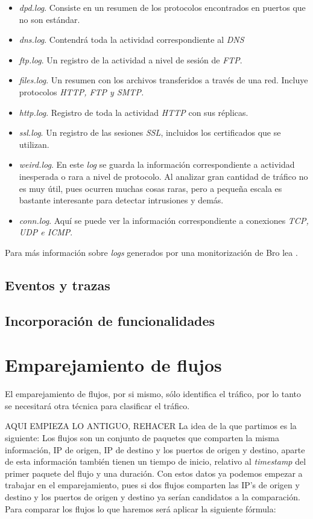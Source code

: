 \begin{itemize}
\item \textit{dpd.log}. Consiste en un resumen de los protocolos encontrados en puertos que no son estándar.
\item \textit{dns.log}. Contendrá toda la actividad correspondiente al \textit{DNS}
\item \textit{ftp.log}. Un registro de la actividad a nivel de sesión de \textit{FTP}.
\item \textit{files.log}. Un resumen con los archivos transferidos a través de una red. Incluye 
protocolos \textit{HTTP, FTP y SMTP.}
\item \textit{http.log}. Registro de toda la actividad \textit{HTTP} con sus réplicas.
\item \textit{ssl.log}. Un registro de las sesiones \textit{SSL}, incluidos los certificados que se utilizan.
\item \textit{weird.log}. En este \textit{log} se guarda la información correspondiente a actividad 
inesperada o rara a nivel de protocolo. Al analizar gran cantidad de tráfico no es muy útil, pues ocurren 
muchas cosas raras, pero a pequeña escala es bastante interesante para detectar intrusiones y demás.
\item \textit{conn.log}. Aquí se puede ver la información correspondiente a conexiones  \textit{TCP, UDP e ICMP}.
\end{itemize}

Para más información sobre \textit{logs} generados por una monitorización de Bro lea \cite{brologs}.


\subsection{Eventos y trazas}

\subsection{Incorporación de funcionalidades}

\section{Emparejamiento de flujos}

El emparejamiento de flujos, por si mismo, sólo identifica el tráfico, por lo tanto se necesitará otra técnica 
para clasificar el tráfico.

AQUI EMPIEZA LO ANTIGUO, REHACER
\intro
La idea de la que partimos es la siguiente: 
Los flujos son un conjunto de paquetes que comparten la misma 
información, IP de origen, IP de destino y los puertos de origen 
y destino, aparte de esta información también tienen un tiempo de 
inicio, relativo al \textit{timestamp} del primer paquete del flujo y una 
duración. Con estos datos ya podemos empezar a trabajar en el 
emparejamiento, pues si dos flujos comparten las IP’s de origen y 
destino y los puertos de origen y destino ya serían candidatos a 
la comparación. 
\intro
Para comparar los flujos lo que haremos será aplicar la siguiente 
fórmula:
\intro

